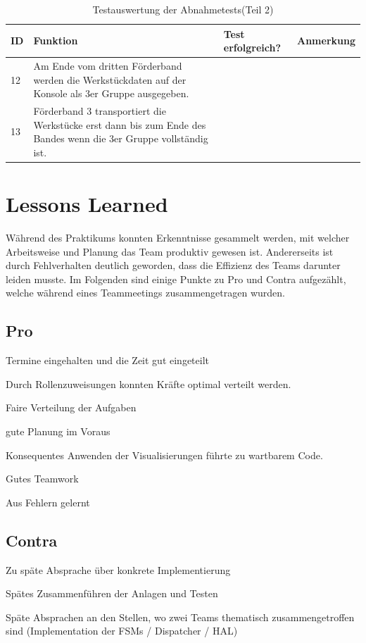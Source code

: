 \documentclass[a4paper, 11pt]{article}
\begin{document}
\newpage

\begin{table}[H]
\center
    \begin{tabularx}{\textwidth}{|l|X|X|X|}
        \hline
        \textbf{ID}&\textbf{Funktion}&\textbf{Test erfolgreich?}&\textbf{Anmerkung}\\
        \hline

        12&Am Ende vom dritten Förderband werden die Werkstückdaten auf der Konsole als 3er Gruppe ausgegeben.&&\\
        \hline
        13&Förderband 3 transportiert die Werkstücke erst dann bis zum Ende des Bandes wenn die 3er Gruppe vollständig ist.&&\\
        \hline
        \end{tabularx}
    \caption{Testauswertung der Abnahmetests(Teil 2)}
    \label{tstl2}
\end{table}

\section{Lessons Learned}
Während des Praktikums konnten Erkenntnisse gesammelt werden, mit welcher Arbeitsweise und Planung das Team produktiv gewesen ist. Andererseits ist durch Fehlverhalten deutlich geworden, dass die Effizienz des Teams darunter leiden musste. Im Folgenden sind einige Punkte zu Pro und Contra aufgezählt, welche während eines Teammeetings zusammengetragen wurden.

\subsection{Pro}
\begin{compactenum}[$\bullet$]
\item Termine eingehalten und die Zeit gut eingeteilt
\medskip
\item Durch Rollenzuweisungen konnten Kräfte optimal verteilt werden.
\medskip
\item Faire Verteilung der Aufgaben
\medskip
\item gute Planung im Voraus
\medskip
\item Konsequentes Anwenden der Visualisierungen führte zu wartbarem Code. 
\medskip
\item Gutes Teamwork
\medskip
\item Aus Fehlern gelernt
\end{compactenum}

\subsection{Contra}
\begin{compactenum}[$\bullet$]
\item Zu späte Absprache über konkrete Implementierung
\medskip
\item Spätes Zusammenführen der Anlagen und Testen
\medskip
\item Späte Absprachen an den Stellen, wo zwei Teams thematisch zusammengetroffen sind (Implementation der FSMs / Dispatcher / HAL)
\end{compactenum}
\end{document}

